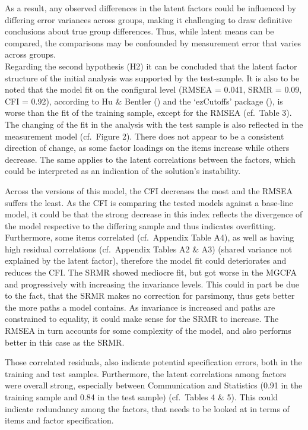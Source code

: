 \documentclass[
  12pt,
  a4paper,
  twoside]{article}
\begin{document}
As a result, any observed differences in the latent factors could be influenced by differing error variances across groups, making it challenging to draw definitive conclusions about true group differences. Thus, while latent means can be compared, the comparisons may be confounded by measurement error that varies across groups.\\
Regarding the second hypothesis (H2) it can be concluded that the latent factor structure of the initial analysis was supported by the test-sample.
It is also to be noted that the model fit on the configural level (RMSEA = 0.041, SRMR = 0.09, CFI = 0.92), according to Hu \& Bentler () and the `ezCutoffs' package (), is worse than the fit of the training sample, except for the RMSEA (cf.~Table 3).
The changing of the fit in the analysis with the test sample is also reflected in the measurement model (cf.~Figure 2).
There does not appear to be a consistent direction of change, as some factor loadings on the items increase while others decrease.
The same applies to the latent correlations between the factors, which could be interpreted as an indication of the solution's instability.

Across the versions of this model, the CFI decreases the most and the RMSEA suffers the least.
As the CFI is comparing the tested models against a base-line model, it could be that the strong decrease in this index reflects the divergence of the model respective to the differing sample and thus indicates overfitting.
Furthermore, some items correlated (cf.~Appendix Table A4), as well as having high residual correlations (cf.~Appendix Tables A2 \& A3) (shared variance not explained by the latent factor), therefore the model fit could deteriorates and reduces the CFI.
The SRMR showed mediocre fit, but got worse in the MGCFA and progressively with increasing the invariance levels. This could in part be due to the fact, that the SRMR makes no correction for parsimony, thus gets better the more paths a model contains.
As invariance is increased and paths are constrained to equality, it could make sense for the SRMR to increase.
The RMSEA in turn accounts for some complexity of the model, and also performs better in this case as the SRMR.

Those correlated residuals, also indicate potential specification errors, both in the training and test samples. Furthermore, the latent correlations among factors were overall strong, especially between Communication and Statistics (0.91 in the training sample and 0.84 in the test sample) (cf.~Tables 4 \& 5).
This could indicate redundancy among the factors, that needs to be looked at in terms of items and factor specification.
\end{document}
